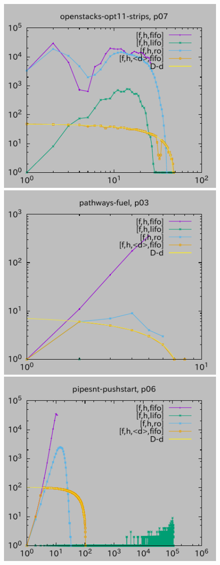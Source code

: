 \begin{figure}[htbp]
\includegraphics{img/depth/openstacks-opt11-strips/p07.pdf}
\includegraphics{img/depth/pathways-fuel/p03.pdf}
\includegraphics{img/depth/pipesnt-pushstart/p06.pdf}

\end{figure}
